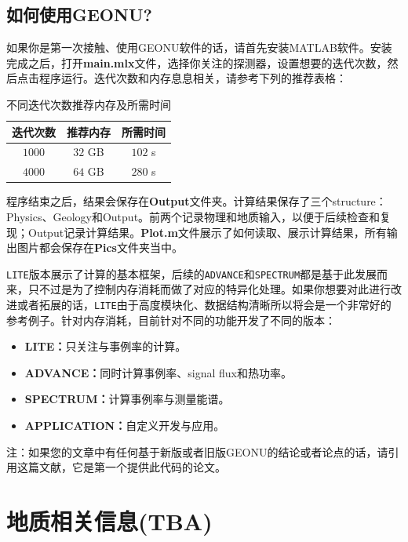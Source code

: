 		\section{如何使用GEONU?}
			如果你是第一次接触、使用GEONU软件的话，请首先安装MATLAB软件。安装完成之后，打开\textbf{main.mlx}文件，选择你关注的探测器，设置想要的迭代次数，然后点击程序运行。迭代次数和内存息息相关，请参考下列的推荐表格：
				\begin{table}[H]
					\centering
					\caption{不同迭代次数推荐内存及所需时间}
					\begin{tabular}{|c|c|c|}
						\hline
						迭代次数 & 推荐内存 & 所需时间\\
						\hline
						$1000$ & $32$ GB & $102$ s\\
						\hline
						$4000$ & $64$ GB & $280$ s\\
						\hline
					\end{tabular}
				\end{table}
			程序结束之后，结果会保存在\textbf{Output}文件夹。计算结果保存了三个structure：Physics、Geology和Output。前两个记录物理和地质输入，以便于后续检查和复现；Output记录计算结果。\textbf{Plot.m}文件展示了如何读取、展示计算结果，所有输出图片都会保存在\textbf{Pics}文件夹当中。\par
			\texttt{LITE}版本展示了计算的基本框架，后续的\texttt{ADVANCE}和\texttt{SPECTRUM}都是基于此发展而来，只不过是为了控制内存消耗而做了对应的特异化处理。如果你想要对此进行改进或者拓展的话，\texttt{LITE}由于高度模块化、数据结构清晰所以将会是一个非常好的参考例子。针对内存消耗，目前针对不同的功能开发了不同的版本：
				\begin{itemize}
					\item \textbf{LITE：}只关注与事例率的计算。
					\item \textbf{ADVANCE：}同时计算事例率、signal flux和热功率。
					\item \textbf{SPECTRUM：}计算事例率与测量能谱。
					\item \textbf{APPLICATION：}自定义开发与应用。
				\end{itemize}
			{\color{red} 注：如果您的文章中有任何基于新版或者旧版GEONU的结论或者论点的话，请引用这篇文献\cite{wipperfurth2020reference}，它是第一个提供此代码的论文。}
	\chapter{地质相关信息(TBA)}
